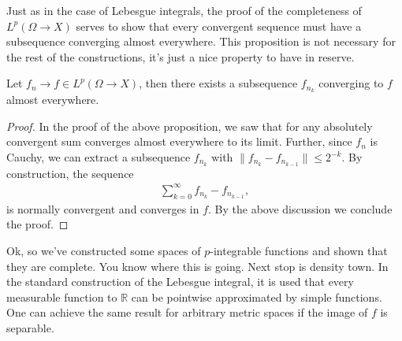 \documentclass[
    a4paper,
    DIV=14,
    abstract=true,
    numbers=noenddot
]{scrartcl}
\begin{document}
Just as in the case of Lebesgue integrals, the proof of the completeness of $L^p(\Omega\to X)$ serves to show that every convergent sequence must have a subsequence converging almost everywhere. This proposition is not necessary for the rest of the constructions, it's just a nice property to have in reserve.
\begin{proposition}
	Let $f_n\to f\in L^p(\Omega\to X)$, then there exists a subsequence $f_{n_k}$ converging to $f$ almost everywhere.
\end{proposition}
\begin{proof}
	In the proof of the above proposition, we saw that for any absolutely convergent sum converges almost everywhere to its limit. Further, since $f_n$ is Cauchy, we can extract a subsequence $f_{n_k}$ with $\|f_{n_k}-f_{n_{k-1}}\|\leq 2^{-k}$. By construction, the sequence
	\begin{align*}
		\sum_{k=0}^{\infty} f_{n_k}-f_{n_{k-1}},
	\end{align*}
	is normally convergent and converges in $f$. By the above discussion we conclude the proof.
\end{proof}
Ok, so we've constructed some spaces of $p$-integrable functions and shown that they are complete. You know where this is going. Next stop is density town. In the standard construction of the Lebesgue integral, it is used that every measurable function to $\mathbb{R}$ can be pointwise approximated by simple functions. One can achieve the same result for arbitrary metric spaces if the image of $f$ is separable.
\end{document}
